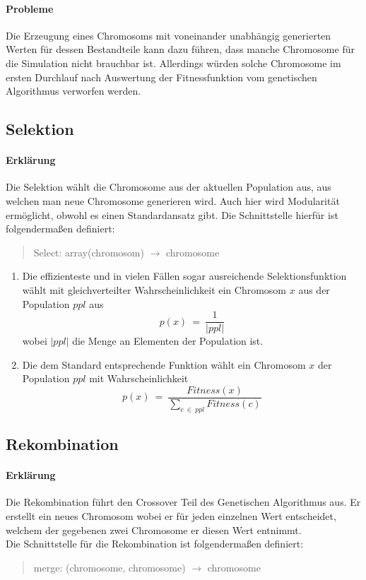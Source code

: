 \documentclass[12pt,a4paper]{scrartcl}
\begin{document}
\paragraph{Probleme}
Die Erzeugung eines Chromosoms mit voneinander unabhängig generierten Werten für dessen Bestandteile kann dazu führen, dass manche Chromosome für die Simulation nicht brauchbar ist. Allerdings  würden solche Chromosome im ersten Durchlauf nach Auswertung der Fitnessfunktion vom genetischen Algorithmus verworfen werden.

\subsection{Selektion}
\paragraph{Erklärung}
Die Selektion wählt die Chromosome aus der aktuellen Population aus, aus welchen man neue Chromosome generieren wird. Auch hier wird Modularität ermöglicht, obwohl es einen Standardansatz gibt. Die Schnittstelle hierfür ist folgendermaßen definiert:
\begin{quote}
 \textsf{Select: array(chromosom) $\rightarrow$ chromosome}
\end{quote}
\begin{enumerate}
	\item Die effizienteste und in vielen Fällen sogar ausreichende Selektionsfunktion wählt mit gleichverteilter Wahrscheinlichkeit ein Chromosom $x$ aus der Population $ppl$ aus $$p(x) ~=~ \frac{1}{|ppl|}$$ wobei $|ppl|$ die Menge an Elementen der Population ist.
	\item Die dem Standard entsprechende Funktion wählt ein Chromosom $x$ der Population $ppl$ mit Wahrscheinlichkeit $$p(x)~=~\frac{Fitness(x)}{\sum_{c ~\in~ ppl}^{}{Fitness(c)}}$$
\end{enumerate}

\subsection{Rekombination}
\paragraph{Erklärung}
Die Rekombination führt den Crossover Teil des Genetischen Algorithmus aus. Er erstellt ein neues Chromosom wobei er für jeden einzelnen Wert entscheidet, welchem der gegebenen zwei Chromosome er diesen Wert entnimmt.\\
Die Schnittstelle für die Rekombination ist folgendermaßen definiert: 
\begin{quote}
	\textsf{merge: (chromosome, chromosome) $\rightarrow$ chromosome}
\end{quote}
\end{document}
